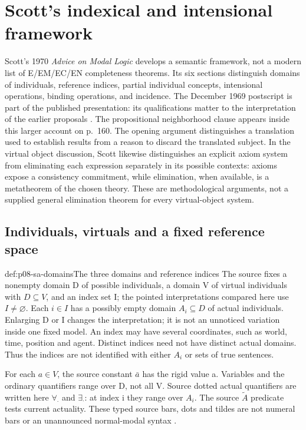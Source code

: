 \section{Scott's indexical and intensional framework}
\label{sec:p08-n-b-006-01}

Scott's 1970 \emph{Advice on Modal Logic} develops a semantic framework,
not a modern list of E/EM/EC/EN completeness theorems. Its six sections
distinguish domains of individuals, reference indices, partial individual
concepts, intensional operations, binding operations, and incidence.
The December 1969 postscript is part of the published presentation:
its qualifications matter to the interpretation of the earlier proposals
\cite[pp.~143--173]{Scott1970}. The propositional neighborhood clause
appears inside this larger account on p.~160.
The opening argument distinguishes a translation used to establish
results from a reason to discard the translated subject. In the virtual
object discussion, Scott likewise distinguishes an explicit axiom system
from eliminating each expression separately in its possible contexts:
axioms expose a consistency commitment, while elimination, when available,
is a metatheorem of the chosen theory. These are methodological arguments,
not a supplied general elimination theorem for every virtual-object system.

\subsection{Individuals, virtuals and a fixed reference space}

\begin{hbdefinition}{def:p08-sa-domains}{The three domains and reference indices}
The source fixes a nonempty domain D of possible individuals, a domain V
of virtual individuals with \(D\subseteq V\), and an index set I;
the pointed interpretations compared here use \(I\ne\varnothing\).
Each \(i\in I\) has a possibly empty domain \(A_i\subseteq D\)
of actual individuals. Enlarging D or I changes the interpretation;
it is not an unnoticed variation inside one fixed model. An index may
have several coordinates, such as world, time, position and agent.
Distinct indices need not have distinct actual domains. Thus the indices
are not identified with either \(A_i\) or sets of true sentences.

For each \(a\in V\), the source constant \(\bar a\) has
the rigid value a. Variables and the ordinary quantifiers range over D,
not all V. Source dotted actual quantifiers are written here
\(\forall_{\cdot}\) and \(\exists_{\cdot}\): at index i
they range over \(A_i\). The source \(\widetilde A\) predicate
tests current actuality. These typed source bars, dots and tildes are
not numeral bars or an unannounced normal-modal syntax
\cite[\S\S I--II, pp.~144--151]{Scott1970}.
\end{hbdefinition}

